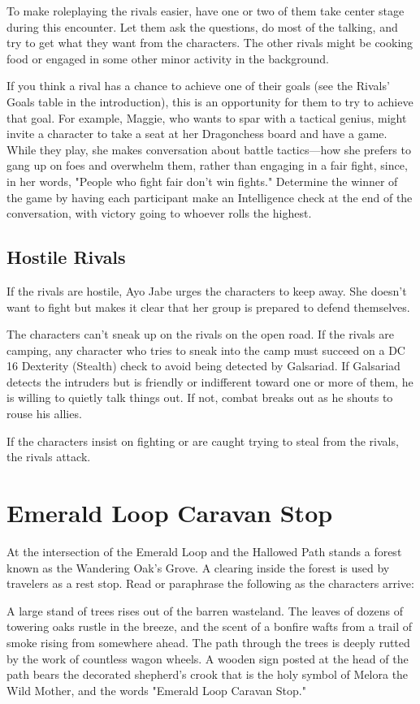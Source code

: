 \documentclass[10pt,a4paper,twoside,bg=print,twocolumn,openany,nodeprecatedcode]{dndbook}
\begin{document}
To make roleplaying the rivals easier, have one or two of them take center stage during this encounter. Let them ask the questions, do most of the talking, and try to get what they want from the characters. The other rivals might be cooking food or engaged in some other minor activity in the background.

If you think a rival has a chance to achieve one of their goals (see the Rivals' Goals table in the introduction), this is an opportunity for them to try to achieve that goal. For example, Maggie, who wants to spar with a tactical genius, might invite a character to take a seat at her Dragonchess board and have a game. While they play, she makes conversation about battle tactics—how she prefers to gang up on foes and overwhelm them, rather than engaging in a fair fight, since, in her words, "People who fight fair don't win fights." Determine the winner of the game by having each participant make an Intelligence check at the end of the conversation, with victory going to whoever rolls the highest.

\subsection{Hostile Rivals}
If the rivals are hostile, Ayo Jabe urges the characters to keep away. She doesn't want to fight but makes it clear that her group is prepared to defend themselves.

The characters can't sneak up on the rivals on the open road. If the rivals are camping, any character who tries to sneak into the camp must succeed on a DC 16 Dexterity (Stealth) check to avoid being detected by Galsariad. If Galsariad detects the intruders but is friendly or indifferent toward one or more of them, he is willing to quietly talk things out. If not, combat breaks out as he shouts to rouse his allies.

If the characters insist on fighting or are caught trying to steal from the rivals, the rivals attack.

\section{Emerald Loop Caravan Stop}
At the intersection of the Emerald Loop and the Hallowed Path stands a forest known as the Wandering Oak's Grove. A clearing inside the forest is used by travelers as a rest stop. Read or paraphrase the following as the characters arrive:

\begin{DndReadAloud}{}
A large stand of trees rises out of the barren wasteland. The leaves of dozens of towering oaks rustle in the breeze, and the scent of a bonfire wafts from a trail of smoke rising from somewhere ahead. The path through the trees is deeply rutted by the work of countless wagon wheels. A wooden sign posted at the head of the path bears the decorated shepherd's crook that is the holy symbol of Melora the Wild Mother, and the words "Emerald Loop Caravan Stop."

\end{DndReadAloud}
\end{document}
